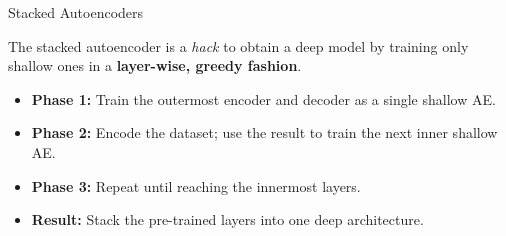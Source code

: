 \documentclass[aspectratio=169,xcolor=dvipsnames,svgnames,x11names,fleqn]{beamer}
\begin{document}
\begin{frame}{Stacked Autoencoders}
    \begin{tcolorbox}[colback=boxblue, colframe=deepblue, title=~]
        The stacked autoencoder is a \textit{hack} to obtain a deep model by training only shallow ones in a \textbf{layer-wise, greedy fashion}.
    \end{tcolorbox}

    \vspace{0.3cm}
    \begin{itemize}
        \item \textbf{Phase 1:} Train the outermost encoder and decoder as a single shallow AE.
        \item \textbf{Phase 2:} Encode the dataset; use the result to train the next inner shallow AE.
        \item \textbf{Phase 3:} Repeat until reaching the innermost layers.
        \item \textbf{Result:} Stack the pre-trained layers into one deep architecture.
    \end{itemize}
\end{frame}
\end{document}
